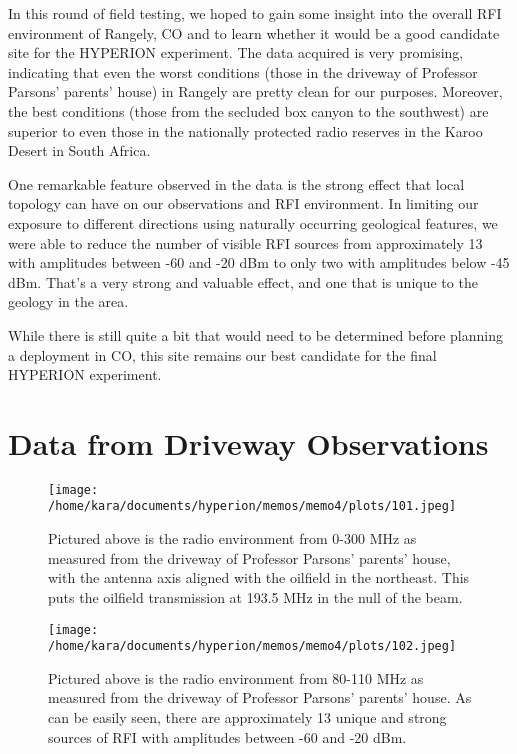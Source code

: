\documentclass[11pt]{article}
\begin{document}
In this round of field testing, we hoped to gain some insight into the overall 
RFI environment of Rangely, CO and to learn whether it would be a good 
candidate site for the HYPERION experiment. The data acquired is very 
promising, indicating that even the worst conditions (those in the driveway of 
Professor Parsons' parents' house) in Rangely are pretty clean for our 
purposes.  Moreover, the best conditions (those from the secluded box canyon to 
the southwest) are superior to even those in the nationally protected radio 
reserves in the Karoo Desert in South Africa.

One remarkable feature observed in the data is the strong effect that local 
topology can have on our observations and RFI environment. In limiting our 
exposure to different directions using naturally occurring geological features, 
we were able to reduce the number of visible RFI sources from approximately 13  
with amplitudes between -60 and -20 dBm to only two with amplitudes below -45 
dBm.  That's a very strong and valuable effect, and one that is unique to the 
geology in the area.

While there is still quite a bit that would need to be determined before 
planning a deployment in CO, this site remains our best candidate for the final 
HYPERION experiment.

{}


\appendix

\section{Data from Driveway Observations}

\begin{figure}[H]
 \begin{center}
 \texttt{[image: /home/kara/documents/hyperion/memos/memo4/plots/101.jpeg]}
 \end{center}
 \caption{
        Pictured above is the radio environment from 0-300 MHz as measured from 
        the driveway of Professor Parsons' parents' house, with the antenna 
        axis aligned with the oilfield in the northeast. This puts the oilfield 
        transmission at 193.5 MHz in the null of the beam.
 }
\end{figure}

\begin{figure}[H]
 \begin{center}
 \texttt{[image: /home/kara/documents/hyperion/memos/memo4/plots/102.jpeg]}
 \end{center}
 \caption{
        Pictured above is the radio environment from 80-110 MHz as measured 
        from the driveway of Professor Parsons' parents' house. As can be 
        easily seen, there are approximately 13 unique and strong sources of 
        RFI with amplitudes between -60 and -20 dBm.
 }
\end{figure}
\end{document}
